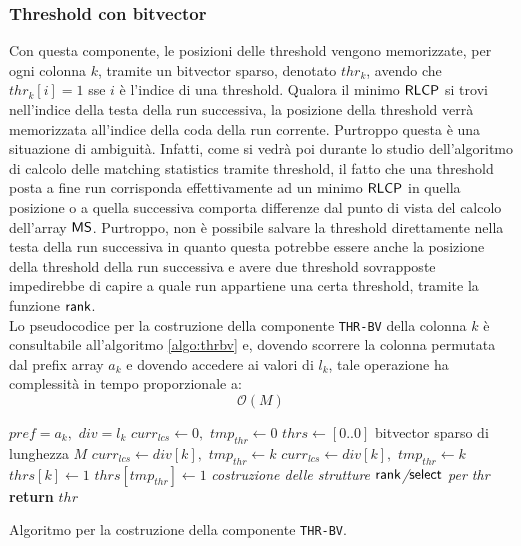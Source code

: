 \subsubsection{Threshold con bitvector}
Con questa componente, le posizioni delle threshold vengono
memorizzate, per ogni colonna $k$, tramite un bitvector sparso, denotato
$thr_k$, avendo che $thr_k[i]=1$ sse $i$ è l'indice di una threshold.
Qualora il minimo $\mbox{\rm {\sf RLCP}}$ si trovi nell'indice della testa della run
successiva, la posizione della threshold verrà memorizzata all'indice
della coda della run corrente. Purtroppo questa è una situazione di ambiguità.
Infatti, come si vedrà poi durante lo studio dell'algoritmo di calcolo delle
matching statistics tramite threshold, il fatto che una threshold posta a fine
run corrisponda effettivamente ad un minimo $\mbox{\rm {\sf RLCP}}$ in quella posizione o a
quella successiva comporta differenze dal punto di vista del calcolo dell'array
$\mbox{\rm {\sf MS}}$. 
Purtroppo, non è possibile salvare la threshold direttamente nella testa della
run successiva in quanto questa potrebbe essere anche la posizione della
threshold della run successiva e avere due threshold sovrapposte impedirebbe di
capire a quale run appartiene una certa threshold, tramite la funzione
$\mbox{\rm {\sf rank}}$. \\
Lo pseudocodice per la costruzione della componente
\texttt{THR-BV} della colonna $k$ è consultabile all'algoritmo \ref{algo:thrbv}
e, dovendo scorrere la colonna permutata dal prefix array $a_k$ e dovendo
accedere ai valori di $l_k$, tale operazione ha complessità in tempo
proporzionale a:
\begin{equation}
  \label{eq:thrbv}
  \mathcal{O}(M)
\end{equation}
\begin{algorithm}
  \begin{algorithmic}
    \Comment $pref=a_k,\,\,div=l_k$
    \State $curr_{lcs}\gets 0,\,\,tmp_{thr}\gets 0$
    \State $thrs\gets[0..0]$
    \Comment bitvector sparso di lunghezza $M$
    \For {\textit{every} $k\in\left[0,\,\, M\right)$}
    \State $curr_{lcs}\gets div[k],\,\,tmp_{thr}\gets k$
    \EndIf
    \State $curr_{lcs}\gets div[k],\,\,tmp_{thr}\gets k$
    \EndIf
    \State $thrs[k]\gets 1$
    \Else
    \State $thrs[tmp_{thr}]\gets 1$
    \EndIf
    \EndIf
    \EndFor
    \State \textit{costruzione delle strutture $\mbox{\rm {\sf rank}}$/$\mbox{\rm {\sf select}}$ per thr}
    \State \textbf{return} $thr$  
    \EndFunction
  \end{algorithmic}
  \caption{Algoritmo per la costruzione della componente \texttt{THR-BV}.}
  \label{algo:thrbv}
\end{algorithm}
